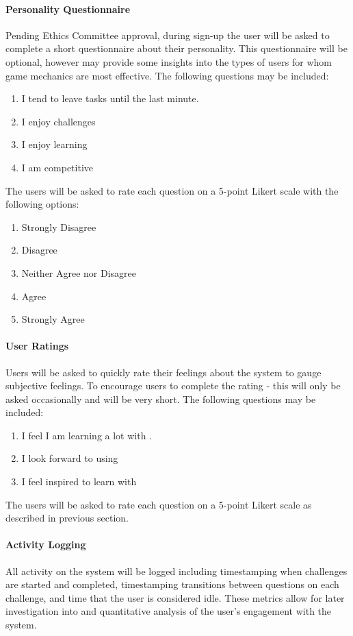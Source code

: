 \paragraph{Personality Questionnaire}
Pending Ethics Committee approval, during sign-up the user will be asked to complete a short questionnaire about their personality. This questionnaire will be optional, however may provide some insights into the types of users for whom game mechanics are most effective. The following questions may be included:

\begin{enumerate}
    \item I tend to leave tasks until the last minute.
    \item I enjoy challenges
    \item I enjoy learning
    \item I am competitive
\end{enumerate}

The users will be asked to rate each question on a 5-point Likert scale \cite{rensis_likert_technique_1932} with the following options:
\begin{enumerate}
	\item Strongly Disagree
	\item Disagree
	\item Neither Agree nor Disagree
	\item Agree
	\item Strongly Agree
\end{enumerate}

\paragraph{User Ratings}
Users will be asked to quickly rate their feelings about the system to gauge subjective feelings. To encourage users to complete the rating - this will only be asked occasionally and will be very short. The following questions may be included:

\begin{enumerate}
    \item I feel I am learning a lot with \SoftName.
    \item I look forward to using \SoftName\
    \item I feel inspired to learn with \SoftName\
\end{enumerate}

The users will be asked to rate each question on a 5-point Likert scale as described in previous section.

\paragraph{Activity Logging}
All activity on the system will be logged including timestamping when challenges are started and 
completed, timestamping transitions between questions on each challenge, and time that 
the user is considered idle. These metrics allow for later investigation into 
and quantitative analysis of the user's engagement with the system.
